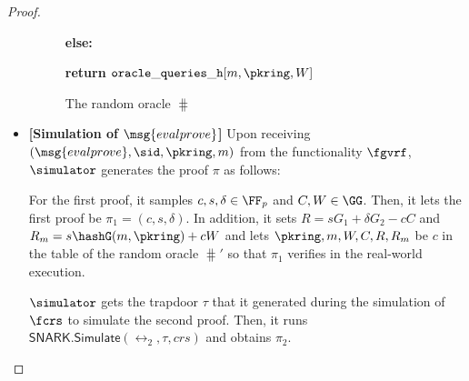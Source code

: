 \begin{proof}
\begin{itemize}
\begin{figure}
{{					
					
					
					\textbf{else:}
					
					
					
					
					
					
					
					
					
					
					\textbf{return $  \mathtt{oracle\_queries\_h}[m, \pkring, W] $}
					
			}}	
			\caption{The random oracle $ \hash $}
			\label{oracle:H}
		\end{figure}
	
	\item \textbf{[Simulation of $ \msg{evalprove} $]} 
	Upon receiving $(\msg{evalprove}, \sid, \pkring, m)$  from the functionality $\fgvrf$, $ \simulator $ generates the proof $ \pi $ as follows:
	
	For the first proof, it samples $ c, s, \delta \in \FF_p $ and $ C, W \in \GG$. Then, it lets the first proof be $\pi_1 =  (c, s, \delta) $. 
	In addition, it sets $ R = sG_1+ \delta G_2- cC $ and $ R_m = s \hashG(m, \pkring)+ cW $ and lets $ \pkring,m, W,C, R, R_m$ be $ c $ in the table of the random oracle $ \hash' $ so that $ \pi_1 $ verifies in the real-world execution.  
	
	 $ \simulator $ gets the trapdoor $ \tau $ that it generated during the simulation of $ \fcrs $ to simulate the second proof. Then, it runs $ \mathsf{SNARK}.\mathsf{Simulate}(\rel_2,\tau, crs) $ and obtains $ \pi_2 $.
	 

\end{itemize}
\end{proof}
